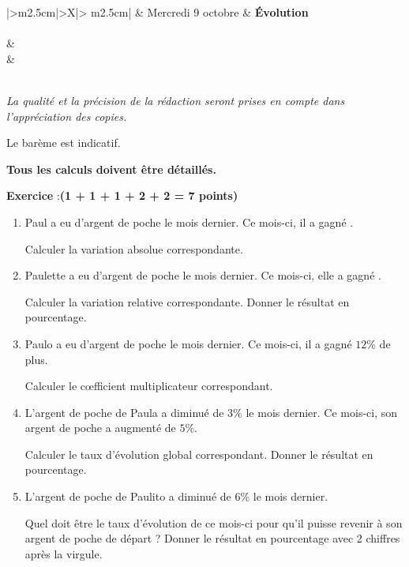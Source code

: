 \documentclass[10pt,french]{article}
\newcounter{exoc}
\newenvironment{exoc}[1]{%
  \refstepcounter{exoc}\textbf{Exercice \theexoc} :\hfill {\textbf{(#1)}}\par
  \medskip}%
{\medskip}
\begin{document}


\begin{center}
\begin{tabularx}{\textwidth}{|>\centering m{2.5cm}|>\centering X|>{\centering\arraybackslash} m{2.5cm}|}
	\iere {} &  Mercredi 9 octobre  & \textbf{\'Evolution} \\
	\hline
		 \\
	\hline
         &  \\
		 &  \\
	\hline
         \\[1cm]
    \hline
\end{tabularx}\bigskip

{\itshape
La qualité et la précision de la rédaction seront prises en compte dans l'appréciation des copies.\par
Le barème est indicatif.\par
\textbf{Tous les calculs doivent être détaillés.}}
\end{center}

\begin{exoc}{1 + 1 + 1 + 2 + 2 = 7 points}
\begin{enumerate}
    \item Paul a eu  d'argent de poche le mois dernier. Ce mois-ci, il a gagné .\par Calculer la variation absolue correspondante.
    \item Paulette a eu  d'argent de poche le mois dernier. Ce mois-ci, elle a gagné .\par Calculer la variation relative correspondante. Donner le résultat en pourcentage.
    \item Paulo a eu  d'argent de poche le mois dernier. Ce mois-ci, il a gagné $12\%$ de plus.\par Calculer le c{\oe}fficient multiplicateur correspondant.
    \item L'argent de poche de Paula a diminué de $3\%$ le mois dernier. Ce mois-ci, son argent de poche a augmenté de $5\%$.\par Calculer le taux d'évolution global correspondant. Donner le résultat en pourcentage.
    \item L'argent de poche de Paulito a diminué de $6\%$ le mois dernier.\par Quel doit être le taux d'évolution de ce mois-ci pour qu'il puisse revenir à son argent de poche de départ ? Donner le résultat en pourcentage avec 2 chiffres après la virgule.
\end{enumerate}
\end{exoc}
\end{document}
